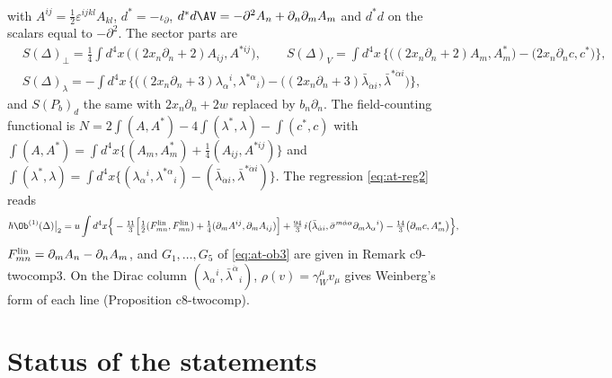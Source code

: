 \begin{remark}
\[\begin{aligned}
\end{aligned}
\]
with $A^{ij}=\tfrac12\varepsilon^{ijkl}A_{kl}$, $d^*=-\iota_\partial$, $d^*d\AV=-\partial^2A_n+\partial_n\partial_mA_m$ and $d^*d$ on the scalars equal to $-\partial^2$. The sector parts are
\[
\begin{aligned}
&S(\Delta)_\perp=\tfrac14\int d^4x\,\big((2x_n\partial_n+2)A_{ij},A^{*ij}\big),\qquad S(\Delta)_V=\int d^4x\,\Big\{\big((2x_n\partial_n+2)A_m,A^*_m\big)-\big(2x_n\partial_nc,c^*\big)\Big\},\\
&S(\Delta)_\lambda=-\int d^4x\,\Big\{\big((2x_n\partial_n+3)\lambda_\alpha{}^i,\lambda^{*\alpha}{}_i\big)-\big((2x_n\partial_n+3)\bar\lambda_{\dot\alpha i},\bar\lambda^{*\dot\alpha i}\big)\Big\},
\end{aligned}
\]
and $S(P_b)_d$ the same with $2x_n\partial_n+2w$ replaced by $b_n\partial_n$. The field-counting functional is $N=2\int(A,A^*)-4\int(\lambda^*,\lambda)-\int(c^*,c)$ with $\int(A,A^*)=\int d^4x\{(A_m,A^*_m)+\tfrac14(A_{ij},A^{*ij})\}$ and $\int(\lambda^*,\lambda)=\int d^4x\{(\lambda_\alpha{}^i,\lambda^{*\alpha}{}_i)-(\bar\lambda_{\dot\alpha i},\bar\lambda^{*\dot\alpha i})\}$. The regression \eqref{eq:at-reg2} reads
\[
\hbar\Ob^{(1)}(\Delta)\big|_2=u\int d^4x\Big\{-\tfrac{11}3\Big[\tfrac12(F^{\rm lin}_{mn},F^{\rm lin}_{mn})+\tfrac14(\partial_mA^{ij},\partial_mA_{ij})\Big]+\tfrac{94}3\,i\big(\bar\lambda_{\dot\alpha i},\bar\sigma^{m\dot\alpha\alpha}\partial_m\lambda_\alpha{}^i\big)-\tfrac{14}3\big(\partial_mc,A^*_m\big)\Big\},
\]
$F^{\rm lin}_{mn}=\partial_mA_n-\partial_nA_m$, and $G_1,\dots,G_5$ of \eqref{eq:at-ob3} are given in Remark c9-twocomp3. On the Dirac column $(\lambda_\alpha{}^i,\bar\lambda^{\dot\alpha}{}_i)$, $\rho(v)=\gamma_W^\mu v_\mu$ gives Weinberg's form of each line (Proposition c8-twocomp).
\end{remark}

\section{Status of the statements}
\label{sec:at-status}

